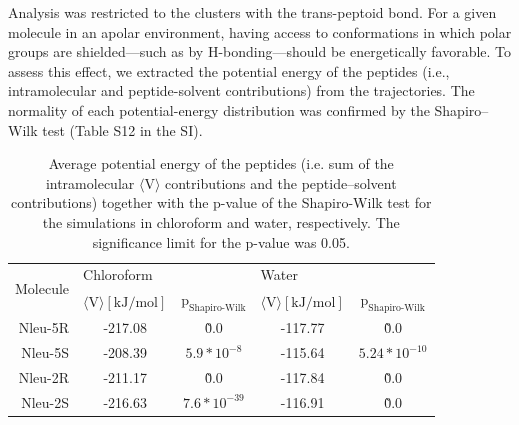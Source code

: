 Analysis was restricted to the clusters with the trans-peptoid bond.
For a given molecule in an apolar environment, having access to conformations in which polar groups are shielded—such as by H-bonding—should be energetically favorable. 
To assess this effect, we extracted the potential energy of the peptides (i.e., intramolecular and peptide-solvent contributions) from the trajectories. 
The normality of each potential-energy distribution was confirmed by the Shapiro–Wilk test \cite{Shapiro1965} (Table S12 in the SI). 

\begin{table}[]
\centering
\caption{ Average potential energy of the peptides  (i.e. sum of the intramolecular $\langle \text{V} \rangle$ contributions  and  the  peptide–solvent  contributions)  together  with  the  p-value  of  the Shapiro-Wilk test for the simulations in chloroform and water, respectively. The significance limit for the p-value was 0.05.}
\label{tab: SIstatTestingNorm}
\begin{tabular}{r|cc|cc}
\multirow{2}{*}{Molecule} & \multicolumn{2}{l}{Chloroform} & \multicolumn{2}{l}{Water}        \\
    & $\langle \text{V} \rangle [\text{kJ}/\text{mol}]$ & $\text{p}_{\text{Shapiro-Wilk}}$ & $\langle \text{V} \rangle [\text{kJ}/\text{mol}]$ & $\text{p}_{\text{Shapiro-Wilk}}$  \\
    \hline
    Nleu-5R    & -217.08    & \~0.0          & -117.77  & \~0.0         \\
    Nleu-5S    & -208.39    &   $5.9*10^{-8}$  & -115.64  & $5.24*10^{-10}$ \\
    Nleu-2R    & -211.17    & \~0.0          & -117.84  & \~0.0         \\
    Nleu-2S    & -216.63    &   $7.6*10^{-39}$ & -116.91  & \~0.0                                        
\end{tabular}%
\end{table}

\begin{table}[]
\centering
\caption{Results of the Fisher t-test to validate the significance of the deviations in the 
average potential energy of the peptides. The significance limit for the p-value was 0.05}
\label{tab: SIstatTestingDiff}
\end{table}


